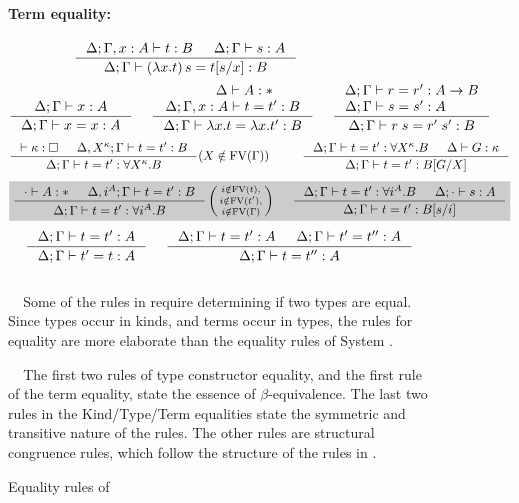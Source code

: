 \begin{figure}
\paragraph{Term equality:} ~~ 
$ \qquad
 ~~~~
   \inference{\Delta;\Gamma,x:A |- t:B & \Delta;\Gamma |- s:A}
             {\Delta;\Gamma |- (\lambda x.t)\,s=t[s/x] : B} $
\[
   \inference{\Delta;\Gamma |- x:A}{\Delta;\Gamma |- x=x:A}
 ~~~~
   \inference{\quad~~ \Delta |- A:* \\ \Delta;\Gamma,x:A |- t=t':B}
             {\Delta;\Gamma |- \lambda x.t = \lambda x.t':B}
 ~~~~
   \inference{\Delta;\Gamma |- r=r':A-> B \\ \Delta;\Gamma |- s=s':A \qquad~}
             {\Delta;\Gamma |- r\;s=r'\;s':B}
\]
\[ \inference{|- \kappa:\square & \Delta, X^\kappa;\Gamma |- t=t' : B}
             {\Delta;\Gamma |- t=t' : \forall X^\kappa.B}
             (X\notin\FV(\Gamma))
 ~~~~ ~~~~
   \inference{ \Delta;\Gamma |- t=t' : \forall X^\kappa.B
             & \Delta |- G:\kappa }
             {\Delta;\Gamma |- t=t' : B[G/X]}
\]
\[ \newFi{
   \inference{\cdot |- A:* & \Delta, i^A;\Gamma |- t=t' : B}
             {\Delta;\Gamma |- t=t' : \forall i^A.B}
   \left(\begin{smallmatrix}
                i\notin\FV(t),\\
                i\notin\FV(t'),\\
                i\notin\FV(\Gamma)\end{smallmatrix}\right)
 ~~~~
   \inference{ \Delta;\Gamma |- t=t' : \forall i^A.B
             & \Delta;\cdot |- s:A}
             {\Delta;\Gamma |- t=t' : B[s/i]} }
\]
\[ \inference{\Delta;\Gamma |- t=t':A}{\Delta;\Gamma |- t'=t:A}
 ~~~~
   \inference{\Delta;\Gamma |- t=t':A & \Delta;\Gamma |- t'=t'':A}
             {\Delta;\Gamma |- t=t'':A}
\]
~\\
$\phantom{A}$ 
Some of the rules in  require determining if two types are equal.
Since types occur in kinds, and terms occur in types, the rules
for equality are more elaborate than the equality rules of System \Fw.

$\phantom{A}$
The first two rules of type constructor equality,
and the first rule of the term equality,
state the essence of $\beta$-equivalence.
The last two rules in the Kind/Type/Term equalities
state the symmetric and transitive nature of the rules.
The other rules are structural congruence rules, which follow
the structure of the rules in .
\caption{Equality rules of \Fi}
\label{fig:eqFi}
\end{figure}

